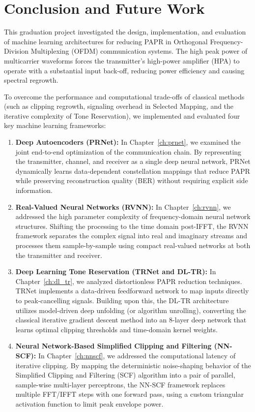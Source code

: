 \chapter{Conclusion and Future Work}
\label{ch:conclusion}


This graduation project investigated the design, implementation, and evaluation of machine learning architectures for reducing PAPR in Orthogonal Frequency-Division Multiplexing (OFDM) communication systems. The high peak power of multicarrier waveforms forces the transmitter's high-power amplifier (HPA) to operate with a substantial input back-off, reducing power efficiency and causing spectral regrowth.

To overcome the performance and computational trade-offs of classical methods (such as clipping regrowth, signaling overhead in Selected Mapping, and the iterative complexity of Tone Reservation), we implemented and evaluated four key machine learning frameworks:

\begin{enumerate}
    \item \textbf{Deep Autoencoders (PRNet):} In Chapter~\ref{ch:prnet}, we examined the joint end-to-end optimization of the communication chain. By representing the transmitter, channel, and receiver as a single deep neural network, PRNet dynamically learns data-dependent constellation mappings that reduce PAPR while preserving reconstruction quality (BER) without requiring explicit side information.
    \item \textbf{Real-Valued Neural Networks (RVNN):} In Chapter~\ref{ch:rvnn}, we addressed the high parameter complexity of frequency-domain neural network structures. Shifting the processing to the time domain post-IFFT, the RVNN framework separates the complex signal into real and imaginary streams and processes them sample-by-sample using compact real-valued networks at both the transmitter and receiver.
    \item \textbf{Deep Learning Tone Reservation (TRNet and DL-TR):} In Chapter~\ref{ch:dl_tr}, we analyzed distortionless PAPR reduction techniques. TRNet implements a data-driven feedforward network to map inputs directly to peak-cancelling signals. Building upon this, the DL-TR architecture utilizes model-driven deep unfolding (or algorithm unrolling), converting the classical iterative gradient descent method into an 8-layer deep network that learns optimal clipping thresholds and time-domain kernel weights.
    \item \textbf{Neural Network-Based Simplified Clipping and Filtering (NN-SCF):} In Chapter~\ref{ch:nnscf}, we addressed the computational latency of iterative clipping. By mapping the deterministic noise-shaping behavior of the Simplified Clipping and Filtering (SCF) algorithm into a pair of parallel, sample-wise multi-layer perceptrons, the NN-SCF framework replaces multiple FFT/IFFT steps with one forward pass, using a custom triangular activation function to limit peak envelope power.
\end{enumerate}

